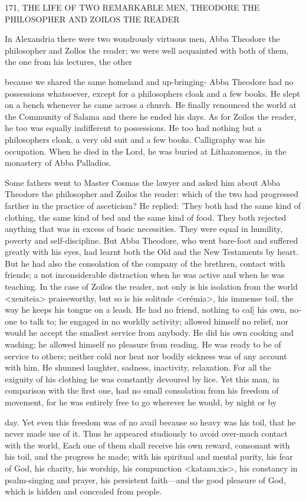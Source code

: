 171, THE LIFE OF TWO REMARKABLE MEN,
THEODORE THE PHILOSOPHER
AND ZOILOS THE READER

In Alexandria there were two wondrously virtuous men, Abba
Theodore the philosopher and Zollos the reader; we were well
acquainted with both of them, the one from his lectures, the other

because we shared the same homeland and up-bringing- Abba
Theodore had no possessions whatsoever, except for a philosopher\textquotesingle s
cloak and a few books.
He slept on a bench whenever he came
across a church.
He finally renounced the world at the Community
of Salama and there he ended his days.
As for Zoilos the reader, he
too was equally indifferent to possessions.
He too had nothing but
a philosopher\textquotesingle s cloak, a very old suit and a few books.
Calligraphy
was his occupation.
When he died in the Lord, he was buried at
Lithazomenos, in the monastery of Abba Palladios.

Some fathers went to Master Cosmas the lawyer and asked him
about Abba Theodore the philosopher and Zoilos the reader: which
of the two had progressed farther in the practice of asceticism? He
replied: 'They both had the same kind of clothing, the same kind of
bed and the same kind of food.
They both rejected anything that
was in excess of basic necessities.
They were equal in humility,
poverty and self-discipline.
But Abba Theodore, who went bare-foot
and suffered greatly with his eyes, had learnt both the Old and the
New Testaments by heart.
But he had also the consolation of the
company of the brethren, contact with friends; a not inconsiderable
distraction when he was active and when he was teaching.
In the
case of Zoilos the reader, not only is his isolation from the world
<xeniteia> praiseworthy, but so is his solitude <erémia>, his
immense toil, the way he keeps his tongue on a leash.
He had no
friend, nothing to cal] his own, no-one to talk to; he engaged in no
worldly activity; allowed himself no relief, nor would he accept the
smallest service from anybody.
He did his own cooking and
washing; he allowed himself no pleasure from reading.
He was ready
to be of service to others; neither cold nor heat nor bodily sickness
was of any account with him.
He shunned laughter, sadness,
inactivity, relaxation.
For all the exiguity of his clothing he was
constantly devoured by lice.
Yet this man, in comparison with the
first one, had no small consolation from his freedom of movement,
for he was entirely free to go wherever he would, by night or by

day.
Yet even this freedom was of no avail because so heavy was his
toil, that he never made use of it.
Thus he appeared studiously to
avoid over-much contact with the world, Each one of them shall
receive his own reward, consonant with his toil, and the progress he
made; with his spiritual and mental purity, his fear of God, his
charity, his worship, his compunction <katanu.xis>, his constancy
in psalm-singing and prayer, his persistent faith—and the good
pleasure of God, which is hidden and concealed from people.

